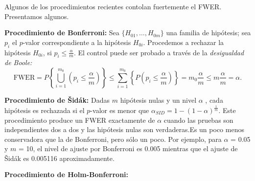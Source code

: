 \documentclass{article}
\theoremstyle{definition}
\begin{document}
Algunos de los procedimientos recientes contolan fuertemente el FWER. Presentamos algunos.

\textbf{Procedimiento de Bonferroni:} 
Sea $\{H_{01},\dots,H_{0m}\}$ una familia de hipótesis; sea $p_i$ el $p$-valor correspondiente a la hipótesis $H_{0i}$. Procedemos a rechazar la hipótesis $H_{0i}$, si $p_i\leq\frac{\alpha}{m}$. El control puede ser probado a través de la \textit{desigualdad de Boole:}
$$\mathrm{FWER}=P\left\{\bigcup_{i=1}^{m_{0}}\left(p_{i} \leq \frac{\alpha}{m}\right)\right\} \leq \sum_{i=1}^{m_{0}}\left\{P\left(p_{i} \leq \frac{\alpha}{m}\right)\right\}=m_{0} \frac{\alpha}{m} \leq m \frac{\alpha}{m}=\alpha.$$

\textbf{Procedimiento de Šidák:} 
Dadas $m$ hipótesis nulas y un nivel $\alpha$ , cada hipótesis es rechazada si el $p$-valor es menor que $\alpha _{{SID}}=1-(1-\alpha )^{{\frac  {1}{m}}}$.
Este procedimiento produce un FWER exactamente de $\alpha$ cuando las pruebas son independientes dos a dos y las hipótesis nulas son verdaderas.Es un poco menos conservadora que la de Bonferroni, pero sólo un poco. Por ejemplo, para $\alpha$  = 0.05 y $m$ = 10, el nivel de ajuste por Bonferroni es 0.005 mientras que el ajuste de Šidák es 0.005116 aproximadamente.

\textbf{Procedimiento de Holm-Bonferroni:} 
\end{document}
